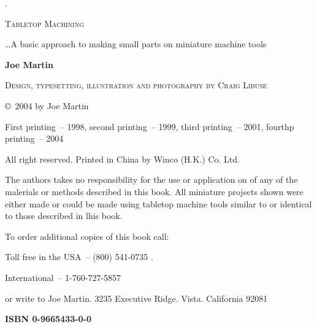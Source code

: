 \begin{titlepage}

\begin{centering}

.

{\Huge\bigskip\textsc{Tabletop Machining}\bigskip}

{\Large \ldots A basic approach to making small parts on miniature machine
tools}

{\Huge \bigskip \textbf{Joe Martin} \bigskip}

{\large \bigskip \textsc{Design, typesetting, illustration and photography by
Craig Libuse } \bigskip}

\bigskip

\copyright\ 2004 by Joe Martin

\bigskip
First printing\ -- 1998, second printing\ -- 1999, third printing\ -- 2001,
fourthp printing\ -- 2004

\bigskip
All right reserved. Printed in China by Winco (H.K.) Co. Ltd.

\bigskip
The authors takes no responsibility for the use or application on of any of the
malerials or methods described in this book.
All miniature projects shown were either made or could be made using tabletop
machine tools similar to or identical to those described in lhis book.

\bigskip
To order additional copies of this book call:

Toll free in the USA\ -- (800) 541-0735 . 

International\ -- 1-760-727-5857

or write to Joe Martin. 3235 Executive Ridge. Vista. California 92081

\bigskip
{\Large \textbf{ISBN 0-9665433-0-0}}

\end{centering}

\end{titlepage}

\secdown\secdown


